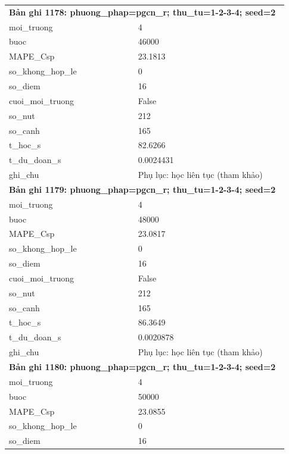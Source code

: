 \begin{longtable}{p{0.43\linewidth}p{0.50\linewidth}}
\midrule
\multicolumn{2}{p{0.95\linewidth}}{\textbf{Bản ghi 1178: phuong\_phap=pgcn\_r; thu\_tu=1-2-3-4; seed=2}} \\
moi\_\allowbreak truong & 4 \\
buoc & 46000 \\
MAPE\_\allowbreak Csp & 23.1813 \\
so\_\allowbreak khong\_\allowbreak hop\_\allowbreak le & 0 \\
so\_\allowbreak diem & 16 \\
cuoi\_\allowbreak moi\_\allowbreak truong & False \\
so\_\allowbreak nut & 212 \\
so\_\allowbreak canh & 165 \\
t\_\allowbreak hoc\_\allowbreak s & 82.6266 \\
t\_\allowbreak du\_\allowbreak doan\_\allowbreak s & 0.0024431 \\
ghi\_\allowbreak chu & Phụ lục: học liên tục (tham khảo) \\
\midrule
\multicolumn{2}{p{0.95\linewidth}}{\textbf{Bản ghi 1179: phuong\_phap=pgcn\_r; thu\_tu=1-2-3-4; seed=2}} \\
moi\_\allowbreak truong & 4 \\
buoc & 48000 \\
MAPE\_\allowbreak Csp & 23.0817 \\
so\_\allowbreak khong\_\allowbreak hop\_\allowbreak le & 0 \\
so\_\allowbreak diem & 16 \\
cuoi\_\allowbreak moi\_\allowbreak truong & False \\
so\_\allowbreak nut & 212 \\
so\_\allowbreak canh & 165 \\
t\_\allowbreak hoc\_\allowbreak s & 86.3649 \\
t\_\allowbreak du\_\allowbreak doan\_\allowbreak s & 0.0020878 \\
ghi\_\allowbreak chu & Phụ lục: học liên tục (tham khảo) \\
\midrule
\multicolumn{2}{p{0.95\linewidth}}{\textbf{Bản ghi 1180: phuong\_phap=pgcn\_r; thu\_tu=1-2-3-4; seed=2}} \\
moi\_\allowbreak truong & 4 \\
buoc & 50000 \\
MAPE\_\allowbreak Csp & 23.0855 \\
so\_\allowbreak khong\_\allowbreak hop\_\allowbreak le & 0 \\
so\_\allowbreak diem & 16 \\

\end{longtable}
